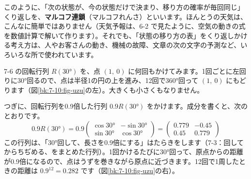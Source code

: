 このように、「次の状態が、今の状態だけで決まり、移り方の確率が毎回同じ」くり返しを、\textbf{マルコフ連鎖}（マルコフれんさ）といいます。ほんとうの天気は、こんなに簡単ではありません（天気予報は、6-2 で見たように、空気の動きの式を数値計算で解いて作ります）。それでも、「状態の移り方の表」をくり返しかける考え方は、人やお客さんの動き、機械の故障、文章の次の文字の予測など、いろいろな所で使われています。


\label{bk:7-10:uzu}7-6 の回転行列 $R(30°)$ を、点 $(1,\ 0)$ に何回もかけてみます。1回ごとに左回りに30°回るので、点は半径1の円の上を進み、12回で360°回って $(1,\ 0)$ にもどります（図\ref{bk:7-10:fig-uzu}の左）。大きくも小さくもなりません。

つぎに、回転行列を0.9倍した行列 $0.9R(30°)$ をかけます。成分を書くと、次のとおりです。
\[ 0.9R(30°)=0.9\begin{pmatrix}\cos30°&-\sin30°\\\sin30°&\cos30°\end{pmatrix}=\begin{pmatrix}0.779&-0.45\\0.45&0.779\end{pmatrix} \]
この行列は、「30°回して、長さを0.9倍にする」はたらきをします（7-3：回してからちぢめる、をまとめた行列）。1回かけるたびに30°回って、原点からの距離が0.9倍になるので、点はうずを巻きながら原点に近づきます。12回で1周したときの距離は $0.9^{12}=0.282$ です（図\ref{bk:7-10:fig-uzu}の右）。


